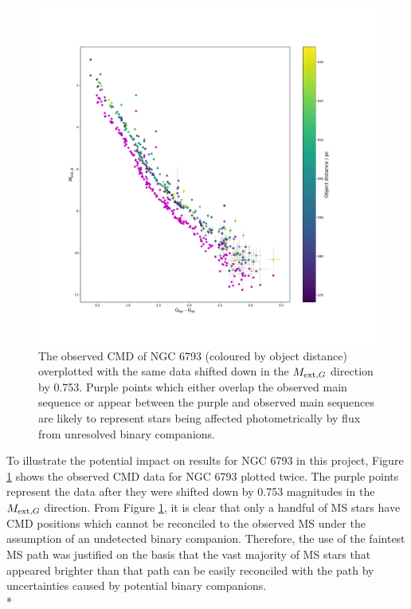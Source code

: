 \documentclass[12pt, a4paper]{report}
\begin{document}
\begin{figure}[h!]
\begin{center}
\includegraphics[width=1.0\textwidth]{../NGC_6793_CMD_Myr_binary_check_vizier.pdf}
\caption{The observed CMD of NGC 6793 (coloured by object distance) overplotted with the same data shifted down in the $M_{\textnormal{ext},G}$ direction by 0.753. Purple points which either overlap the observed main sequence or appear between the purple and observed main sequences are likely to represent stars being affected photometrically by flux from unresolved binary companions.}
\label{NGC_6793_binary}
\end{center}
\end{figure}

To illustrate the potential impact on results for NGC 6793 in this project, Figure \ref{NGC_6793_binary} shows the observed CMD data for NGC 6793 plotted twice. The purple points represent the data after they were shifted down by 0.753 magnitudes in the $M_{\textnormal{ext},G}$ direction. From Figure \ref{NGC_6793_binary}, it is clear that only a handful of MS stars have CMD positions which cannot be reconciled to the observed MS under the assumption of an undetected binary companion. Therefore, the use of the faintest MS path was justified on the basis that the vast majority of MS stars that appeared brighter than that path can be easily reconciled with the path by uncertainties caused by potential binary companions.\\*
\end{document}
